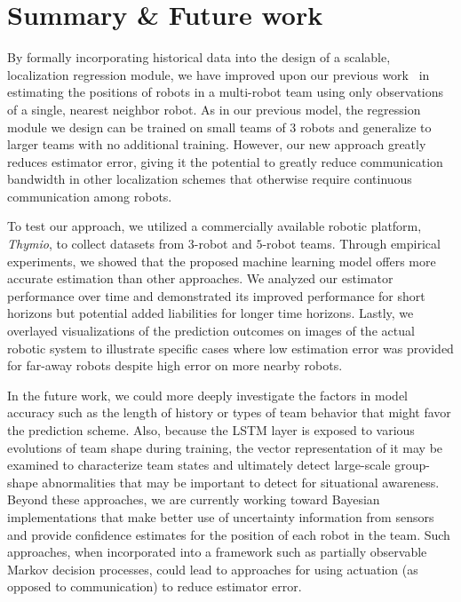\documentclass[letterpaper, 10 pt, conference]{ieeeconf}  %
\begin{document}
	\section{Summary \& Future work}
	\label{sec:discussion_and_future_work}

    By formally incorporating historical data into the design of a
    scalable, localization regression module, we have improved upon our
    previous work~\cite{CPR17} in estimating the positions of robots in
    a multi-robot team using only observations of a single, nearest
    neighbor robot. As in our previous model, the regression module we
    design can be trained on small teams of 3 robots and generalize to
    larger teams with no additional training. However, our new approach
    greatly reduces estimator error, giving it the potential to greatly
    reduce communication bandwidth in other localization schemes that
    otherwise require continuous communication among robots.

    To test our approach, we utilized a commercially available robotic
    platform, \emph{Thymio}, to collect datasets from $3$-robot and
    $5$-robot teams. Through empirical experiments, we showed that the
    proposed machine learning model offers more accurate estimation than
    other approaches. We analyzed our estimator performance over time
    and demonstrated its improved performance for short horizons but
    potential added liabilities for longer time horizons. Lastly, we
    overlayed visualizations of the prediction outcomes on images of the
    actual robotic system to illustrate specific cases where low
    estimation error was provided for far-away robots despite high error
    on more nearby robots.

    In the future work, we could more deeply investigate the factors in
    model accuracy such as the length of history or types of team
    behavior that might favor the prediction scheme. Also, because the
    LSTM layer is exposed to various evolutions of team shape during
    training, the vector representation of it may be examined to
    characterize team states and ultimately detect large-scale
    group-shape abnormalities that may be important to detect for
    situational awareness. Beyond these approaches, we are currently
    working toward Bayesian implementations that make better use of
    uncertainty information from sensors and provide confidence
    estimates for the position of each robot in the team. Such
    approaches, when incorporated into a framework such as partially
    observable Markov decision processes, could lead to approaches for
    using actuation (as opposed to communication) to reduce estimator
    error.

{\small
	
	
}
\end{document}

